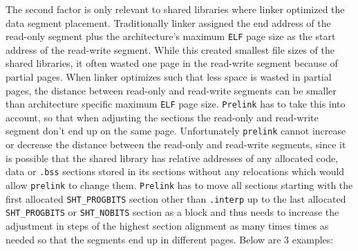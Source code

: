 \documentclass[twoside]{article}
\def\tts#1{\texttt{\small #1}}
\begin{document}
The second factor is only relevant to shared libraries where linker
optimized the data segment placement.  Traditionally linker assigned
the end address of the read-only segment plus the architecture's
maximum \tts{ELF} page size as the start address of the read-write
segment.  While this created smallest file sizes of the shared libraries,
it often wasted one page in the read-write segment because of partial
pages.  When linker optimizes such that less space is wasted in partial
pages, the distance between read-only and read-write segments can be
smaller than architecture specific maximum \tts{ELF} page size.
\tts{Prelink} has to take this into account, so that when adjusting
the sections the read-only and read-write segment don't end up on the
same page.  Unfortunately \tts{prelink} cannot increase or decrease
the distance between the read-only and read-write segments, since
it is possible that the shared library has relative addresses of
any allocated code, data or \tts{.bss} sections
stored in its sections without any relocations which would allow
\tts{prelink} to change them.  \tts{Prelink} has to move all sections
starting with the first allocated \tts{SHT\_PROGBITS} section other
than \tts{.interp} up to the last allocated \tts{SHT\_PROGBITS} or
\tts{SHT\_NOBITS} section as a block and thus needs to increase
the adjustment in steps of the highest section alignment as many times
times as needed so that the segments end up in different pages.
Below are 3 examples:
\end{document}
